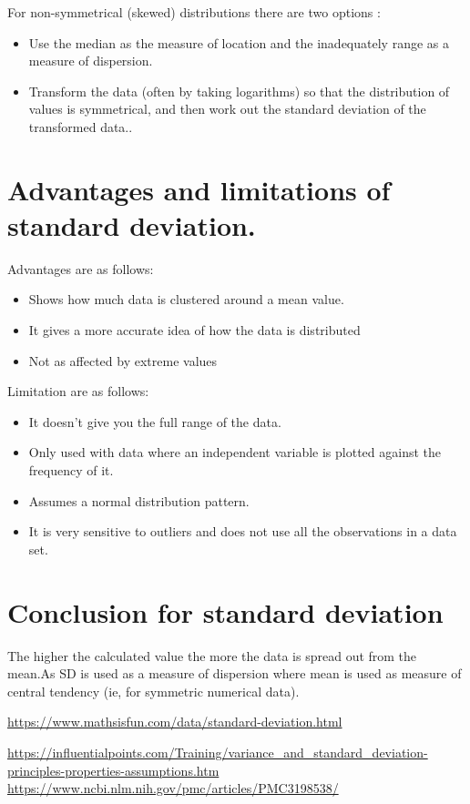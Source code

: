 \documentclass{article}
\begin{document}
For non-symmetrical (skewed) distributions there are two options :
\begin{itemize}
  \item Use the median as the measure of location and the inadequately range as a measure of dispersion.	
  \item Transform the data (often by taking logarithms) so that the distribution of values is symmetrical, and then work out the standard deviation of the transformed data..
\end{itemize}
\section{Advantages and limitations of standard deviation.}
Advantages are as follows:
\begin{itemize}
  \item Shows how much data is clustered around a mean value.	
  \item It gives a more accurate idea of how the data is distributed
  \item Not as affected by extreme values
\end{itemize}
\break
Limitation are as follows:
\begin{itemize}
  \item It doesn't give you the full range of the data.	
  \item Only used with data where an independent variable is plotted against the frequency of it.
  \item Assumes a normal distribution pattern.
  \item  It is very sensitive to outliers and does not use all the observations in a data set.
\end{itemize}
\section{Conclusion for standard deviation}
The higher the calculated value the more the data is spread out from the mean.As SD is used as a measure of dispersion where mean is used as measure of central tendency (ie, for symmetric numerical data).


  
\begin{thebibliography}{1}

\url{https://www.mathsisfun.com/data/standard-deviation.html}

\url{https://influentialpoints.com/Training/variance_and_standard_deviation-principles-properties-assumptions.htm}
\url{https://www.ncbi.nlm.nih.gov/pmc/articles/PMC3198538/}

\end{thebibliography}
\end{document}
